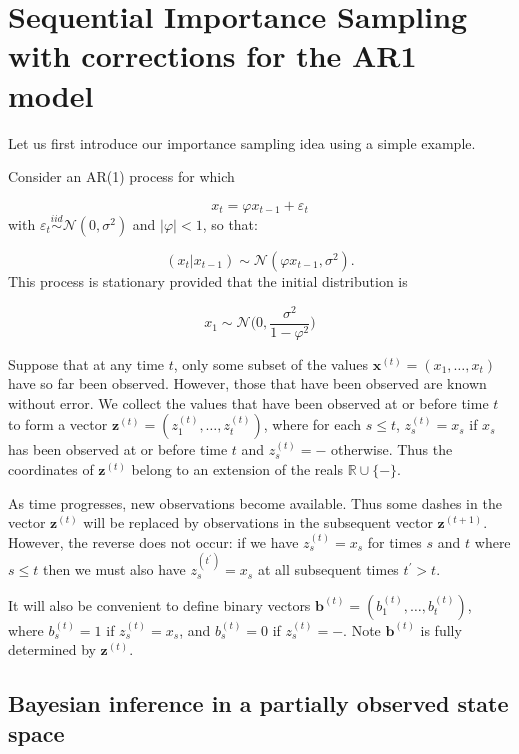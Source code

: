 \documentclass[11pt,a4paper]{article}
\newcommand{\eps}{\varepsilon}
\renewcommand{\vec}[1]{\mathbf{#1}}
\begin{document}
\section{Sequential Importance Sampling with corrections for the AR1 model}

Let us first introduce our importance sampling idea using a simple example.

Consider an AR(1) process for which

\[
x_{t} = \varphi x_{t-1} + \eps_{t}
\]
with $\eps_{t} \stackrel{iid}{\sim} \mathcal{N}(0, \sigma^{2})$ and $|\varphi| < 1$, so that:

\[
(x_{t} | x_{t-1}) \sim \mathcal{N} (\varphi x_{t-1}, \sigma^{2}).
\]
This process is stationary provided that the initial distribution is

\[
x_{1} \sim \mathcal{N} \Bigg (0, \frac{\sigma^2}{1- \varphi^2} \Bigg )
\]

Suppose that at any time $t$, only some subset of the values $\vec {x}^{(t)} = (x_1, \dots, x_{t})$ have so far been observed. However, those that have been observed are known without error. We collect the values that have been observed at or before time $t$ to form a vector $\vec{z}^{(t)} = (z_1^{(t)}, \dots, z_{t}^{(t)})$, where for each $s \leq t$, $z_s^{(t)} = x_s$ if $x_s$ has been observed at or before time $t$ and $z_s^{(t)} = -$ otherwise. Thus the coordinates of $\vec{z}^{(t)}$ belong to an extension of the reals $\mathbb{R} \cup \{ - \}$.

As time progresses, new observations become available. Thus some dashes in the vector $\vec{z}^{(t)}$ will be replaced by observations in the subsequent vector $\vec{z}^{(t+1)}$. However, the reverse does not occur: if we have $z_s^{(t)} = x_s$ for times $s$ and $t$ where $s \leq t$ then we must also have $z_s^{(t^{\prime})} = x_s$ at all subsequent times $t^{\prime} > t$.

It will also be convenient to define binary vectors $\vec{b}^{(t)} = (b_1^{(t)}, \dots, b_{t}^{(t)})$, where $b_s^{(t)} = 1$ if $z_s^{(t)} = x_s$, and $b_s^{(t)} = 0$ if $z_s^{(t)} = -$. Note $\vec{b}^{(t)}$ is fully determined by $\vec{z}^{(t)}$.

\subsection{Bayesian inference in a partially observed state space}
\end{document}
